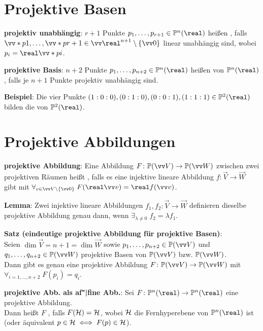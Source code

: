 \section{%
    Projektive Basen%
}

\textbf{projektiv unabhängig}:
$r+1$ Punkte $p_1, \dotsc, p_{r+1} \in \PP^n(\real)$ heißen , falls
$\vec*{p}{1}, \dotsc, \vec*{p}{r+1} \in \vec{\real}^{n+1} \setminus \{\vec{0}\}$ linear unabhängig
sind, wobei $p_i = \real\vec*{p}{i}$.

\textbf{projektive Basis}:
$n+2$ Punkte $p_1, \dotsc, p_{n+2} \in \PP^n(\real)$ heißen
von $\PP^n(\real)$, falls je $n+1$ Punkte projektiv unabhängig sind.

\textbf{Beispiel}:
Die vier Punkte $(1:0:0), (0:1:0), (0:0:1), (1:1:1) \in \PP^2(\real)$ bilden die
 von $\PP^2(\real)$.

\pagebreak

\section{%
    Projektive Abbildungen%
}

\textbf{projektive Abbildung}:
Eine Abbildung $F\colon \PP(\vec{V}) \to \PP(\vec{W})$ zwischen zwei projektiven Räumen heißt
, falls es eine injektive lineare Abbildung
$f\colon \vec{V} \to \vec{W}$ gibt mit
$\forall_{v \in \vec{V} \setminus \{\vec{0}\}}\; F(\real\vec{v}) = \real f(\vec{v})$.

\textbf{Lemma}:
Zwei injektive lineare Abbildungen $f_1, f_2\colon \vec{V} \to \vec{W}$ definieren dieselbe
projektive Abbildung genau dann, wenn $\exists_{\lambda\not=0}\; f_2 = \lambda f_1$.

\textbf{Satz (eindeutige projektive Abbildung für projektive Basen)}:\\
Seien $\dim \vec{V} = n + 1 = \dim \vec{W}$ sowie $p_1, \dotsc, p_{n+2} \in \PP(\vec{V})$ und
$q_1, \dotsc, q_{n+2} \in \PP(\vec{W})$ projektive Basen von $\PP(\vec{V})$ bzw. $\PP(\vec{W})$.\\
Dann gibt es genau eine projektive Abbildung $F\colon \PP(\vec{V}) \to \PP(\vec{W})$ mit
$\forall_{i = 1, \dotsc, n+2}\; F(p_i) = q_i$.

\linie

\textbf{projektive Abb. als af"|fine Abb.}:
Sei $F\colon \PP^n(\real) \to \PP^n(\real)$ eine projektive Abbildung.\\
Dann heißt $F$ , falls $F(\mathcal{H}) = \mathcal{H}$,
wobei $\mathcal{H}$ die Fernhyperebene von $\PP^n(\real)$ ist\\
(oder äquivalent $p \in \mathcal{H} \iff F(p) \in \mathcal{H}$).


